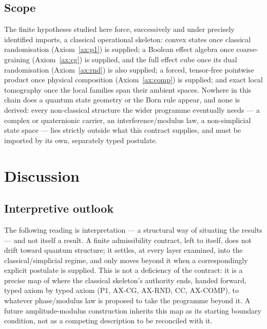 \documentclass[11pt,a4paper]{article}
\begin{document}
  \subsection{Scope}
    \label{ssec:scope}

    The finite hypotheses studied here force, successively and under precisely identified imports, a
    classical operational skeleton: convex states once classical randomisation (Axiom~\ref{ax:p1}) is
    supplied; a Boolean effect algebra once coarse-graining (Axiom~\ref{ax:cg}) is supplied, and the full
    effect cube once its dual randomisation (Axiom~\ref{ax:rnd}) is also supplied; a forced, tensor-free
    pointwise product once physical composition (Axiom~\ref{ax:comp}) is supplied; and exact local tomography
    once the local families span their ambient spaces.
    Nowhere in this chain does a quantum state geometry or the Born rule appear, and none is derived: every
    non-classical structure the wider programme eventually needs --- a complex or quaternionic carrier, an
    interference/modulus law, a non-simplicial state space --- lies strictly outside what this contract
    supplies, and must be imported by its own, separately typed postulate.

  \section{Discussion}
  \label{sec:discussion}

  \subsection{Interpretive outlook}
    \label{ssec:outlook}

    The following reading is interpretation --- a structural way of situating the results --- and not itself
    a result.
    A finite admissibility contract, left to itself, does not drift toward quantum structure; it settles, at
    every layer examined, into the classical/simplicial regime, and only moves beyond it when a
    correspondingly explicit postulate is supplied.
    This is not a deficiency of the contract: it is a precise map of where the classical skeleton's authority
    ends, handed forward, typed axiom by typed axiom (P1, AX-CG, AX-RND, CC, AX-COMP), to whatever
    phase/modulus law is proposed to take the programme beyond it.
    A future amplitude-modulus construction inherits this map as its starting boundary condition, not as a
    competing description to be reconciled with it.
\end{document}

